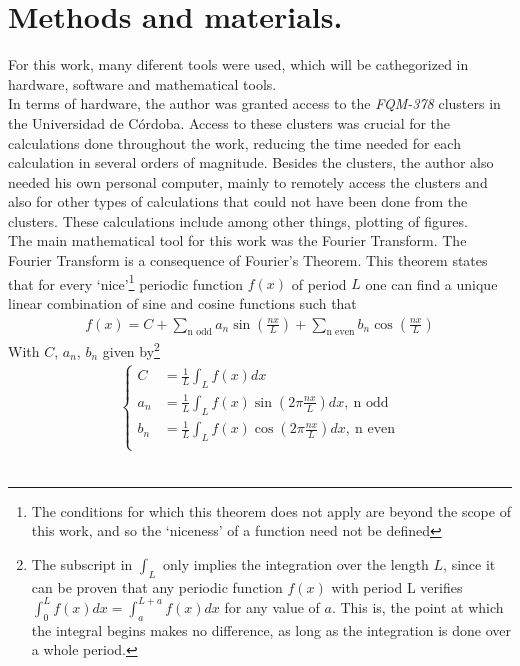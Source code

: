 \chapter{Methods and materials.}
\label{cap:met-mat}

For this work, many diferent tools were used, which will be cathegorized in hardware, software and mathematical tools. \\

In terms of hardware, the author was granted access to the \textit{FQM-378} clusters in the Universidad de Córdoba. Access to these clusters was crucial for the calculations done throughout the work, reducing the time needed for each calculation in several orders of magnitude. Besides the clusters, the author also needed his own personal computer, mainly to remotely access the clusters and also for other types of calculations that could not have been done from the clusters. These calculations include among other things, plotting of figures.  \\

The main mathematical tool for this work was the Fourier Transform. The Fourier Transform is a consequence of Fourier's Theorem. This theorem states that for every `nice'\footnote{The conditions for which this theorem does not apply are beyond the scope of this work, and so the `niceness' of a function need not be defined} periodic function $f(x)$ of period $L$ one can find a unique linear combination of sine and cosine functions such that 
\begin{align}
	f(x) = C + \sum_\text{n odd} a_n \sin\left( \frac{nx}{L} \right) + \sum_{\text{n even}}^{} b_n \cos \left( \frac{nx}{L} \right) 
\end{align}
With $C $, $a_n$, $b_n$ given by\footnote{The subscript in $\int_{L}^{} $ only implies the integration over the length $L$, since it can be proven that any periodic function $f(x)$ with period L verifies $ \int_{0}^{L} f(x)dx = \int_{a}^{L+a} f(x)dx $ for any value of $a$. This is, the point at which the integral begins makes no difference, as long as the integration is done over a whole period. }
\begin{align}
	\begin{cases}
		C &= \frac{1}{L} \int_{L}^{} f(x) dx\\
		a_n &= \frac{1}{L} \int_{L}^{} f(x) \sin\left(  2\pi \frac{nx}{L} \right) dx,~\text{n odd}\\
		b_n &= \frac{1}{L} \int_{L}^{} f(x) \cos\left(  2\pi \frac{nx}{L} \right) dx,~\text{n even}\\
	\end{cases}
\end{align}\\

